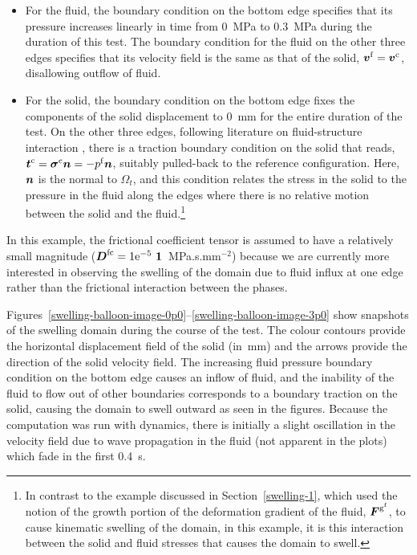 \begin{itemize}
\item For the fluid, the boundary condition on the bottom edge
  specifies that its pressure increases linearly in time from 0~MPa to
  0.3~MPa during the duration of this test. The boundary condition for
  the fluid on the other three edges specifies that its velocity field
  is the same as that of the solid, $\mbox{\boldmath$ v$}^{\mathrm{f}} =
  \mbox{\boldmath$ v$}^{\mathrm{c}}$, disallowing outflow of fluid.
\item For the solid, the boundary condition on the bottom edge fixes
  the components of the solid displacement to 0~mm for the entire
  duration of the test. On the other three edges, following literature
  on fluid-structure interaction \citep{doneaetal2004}, there is a
  traction boundary condition on the solid that reads,
  $\mbox{\boldmath$ t$}^{\mathrm{c}}=\mbox{\boldmath$\sigma$}^{\mathrm{c}} \mbox{\boldmath$ n$} = -p^{\mathrm{f}} \mbox{\boldmath$ n$}$,
  suitably pulled-back to the reference configuration. Here, $\mbox{\boldmath$ n$}$ is
  the normal to $\Omega_{t}$, and this condition relates the stress in
  the solid to the pressure in the fluid along the edges where there
  is no relative motion between the solid and the fluid.\footnote{In
    contrast to the example discussed in Section~\ref{swelling-1},
    which used the notion of the growth portion of the deformation
    gradient of the fluid, $\mbox{\boldmath$ F$}^{\mathrm{g}^\mathrm{f}}$, to cause
    kinematic swelling of the domain, in this example, it is this
    interaction between the solid and fluid stresses that causes the
    domain to swell.}
\end{itemize}

In this example, the frictional coefficient tensor is assumed to have
a relatively small magnitude ($\bD^{\mathrm{fc}} =
1\mathrm{e}^{-5}\ \bone$~MPa.s.mm$^{-2}$) because we are currently
more interested in observing the swelling of the domain due to fluid
influx at one edge rather than the frictional interaction between the
phases.

Figures~\ref{swelling-balloon-image-0p0}--\ref{swelling-balloon-image-3p0}
show snapshots of the swelling domain during the course of the
test. The colour contours provide the horizontal displacement field of
the solid (in~mm) and the arrows provide the direction of the solid
velocity field. The increasing fluid pressure boundary condition on
the bottom edge causes an inflow of fluid, and the inability of the
fluid to flow out of other boundaries corresponds to a boundary traction
on the solid, causing the domain to swell outward as seen in
the figures.  Because the computation was run with dynamics, there is
initially a slight oscillation in the velocity field due to wave
propagation in the fluid (not apparent in the plots) which fade in the
first 0.4~s.

